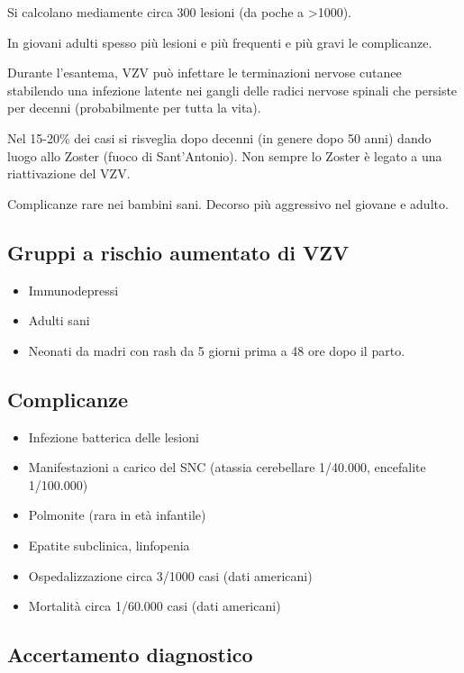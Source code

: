 Si calcolano mediamente circa 300 lesioni (da poche a
>1000).

In giovani adulti spesso più lesioni e più frequenti e più gravi le
complicanze.

Durante l'esantema, VZV può infettare le terminazioni nervose cutanee
stabilendo una infezione latente nei gangli delle radici nervose spinali
che persiste per decenni (probabilmente per tutta la vita).

Nel 15-20\% dei casi si risveglia dopo decenni (in genere dopo 50 anni)
dando luogo allo Zoster (fuoco di Sant'Antonio). Non sempre lo Zoster è
legato a una riattivazione del VZV.

Complicanze rare nei bambini sani. Decorso più aggressivo nel giovane e
adulto.

\subsection{Gruppi a rischio aumentato di VZV}

\begin{itemize}
\item
  Immunodepressi
\item
  Adulti sani
\item
  Neonati da madri con rash da 5 giorni prima a 48 ore dopo il parto.
\end{itemize}

\subsection{Complicanze}

\begin{itemize}
\item
  Infezione batterica delle lesioni
\item
  Manifestazioni a carico del SNC (atassia cerebellare 1/40.000,
  encefalite 1/100.000)
\item
  Polmonite (rara in età infantile)
\item
  Epatite subclinica, linfopenia
\item
  Ospedalizzazione circa 3/1000 casi (dati americani)  
\item
  Mortalità circa 1/60.000 casi (dati americani)
\end{itemize}

\subsection{Accertamento diagnostico}

